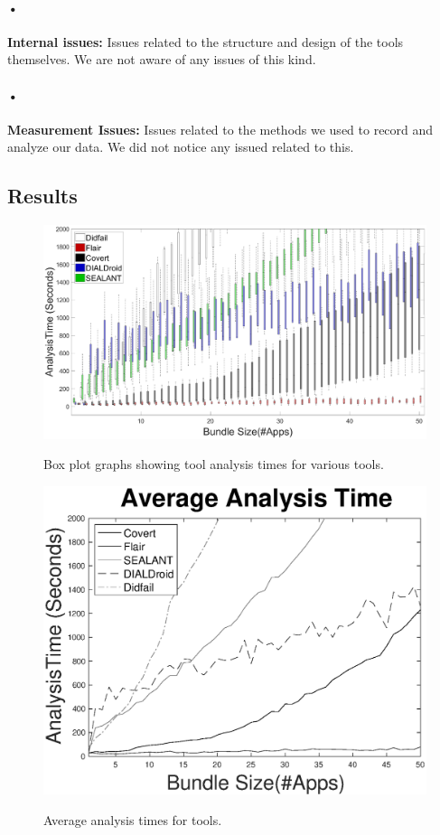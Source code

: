\documentclass[twocolumn]{article}
\begin{document}
\paragraph{•}
	\textbf{Internal issues:} Issues related to the structure and design of the tools themselves. We are not aware of any issues of this kind.
\paragraph{•}
	\textbf{Measurement Issues:} Issues related to the methods we used to record and analyze our data. We did not notice any issued related to this.
	
\clearpage
\newpage

\subsection{Results}

\begin{figure}[!ht]

\centering
	\includegraphics[width=\linewidth]{BoxPlotGraph}
	\label{figure:1}
	\caption{Box plot graphs showing tool analysis times for various tools.}
\end{figure}


	\begin{figure}[H]
		\includegraphics[width=\linewidth]{AverageGraph}
		\label{figure:2}
		\caption{Average analysis times for tools.}
	\end{figure}
	
\end{document}
